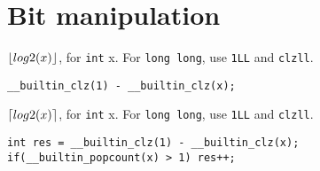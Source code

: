 \section{Bit manipulation}

$\lfloor log2(x)\rfloor$, for \verb|int| x. For \verb|long long|, use \verb|1LL| and \verb|clzll|.
\begin{lstlisting}
__builtin_clz(1) - __builtin_clz(x);
\end{lstlisting}

$\lceil log2(x)\rceil$, for \verb|int| x. For \verb|long long|, use \verb|1LL| and \verb|clzll|.
\begin{lstlisting}
int res = __builtin_clz(1) - __builtin_clz(x);
if(__builtin_popcount(x) > 1) res++;
\end{lstlisting}
